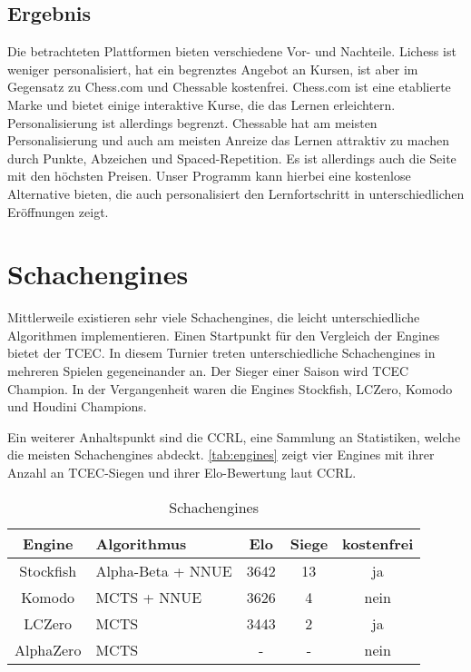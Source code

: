 \subsection{Ergebnis}
Die betrachteten Plattformen bieten verschiedene Vor- und Nachteile. Lichess ist weniger personalisiert, hat ein begrenztes Angebot an Kursen, ist aber im Gegensatz zu Chess.com und Chessable kostenfrei. Chess.com ist eine etablierte Marke und bietet einige interaktive Kurse, die das Lernen erleichtern. Personalisierung ist allerdings begrenzt. Chessable hat am meisten Personalisierung und auch am meisten Anreize das Lernen attraktiv zu machen durch Punkte, Abzeichen und Spaced-Repetition. Es ist allerdings auch die Seite mit den höchsten Preisen.
Unser Programm kann hierbei eine kostenlose Alternative bieten, die auch personalisiert den Lernfortschritt in unterschiedlichen Eröffnungen zeigt.

\section{Schachengines}
Mittlerweile existieren sehr viele Schachengines, die leicht unterschiedliche Algorithmen implementieren.
Einen Startpunkt für den Vergleich der Engines bietet der \ac{TCEC}. In diesem Turnier treten unterschiedliche Schachengines in mehreren Spielen gegeneinander an. Der Sieger einer Saison wird  \ac{TCEC} Champion. In der Vergangenheit waren die Engines Stockfish, LCZero, Komodo und Houdini Champions. \cite{tcec_chessdom_tcec-chess_2025}

Ein weiterer Anhaltspunkt sind die \acf{CCRL}, eine Sammlung an Statistiken, welche die meisten Schachengines abdeckt. \cite{ccrl_team_ccrl_2025}
\autoref{tab:engines} zeigt vier Engines mit ihrer Anzahl an \ac{TCEC}-Siegen und ihrer Elo-Bewertung laut \ac{CCRL}.

\begin{table}[h]
    \centering
    \begin{tabular}{|c|l|c|c|c|}
        \hline
        Engine & Algorithmus & Elo & Siege & kostenfrei \\
        \hline
        Stockfish & Alpha-Beta + \acs{NNUE} & 3642 & 13 & ja \\
        \hline
        Komodo & \acs{MCTS} + \acs{NNUE} & 3626 & 4 & nein \\
        \hline
        LCZero & \acs{MCTS} & 3443 & 2 & ja \\
        \hline
        AlphaZero & \acs{MCTS} & - & - & nein \\
        \hline
    \end{tabular}
    \caption{Schachengines}
    \label{tab:engines}
\end{table}

